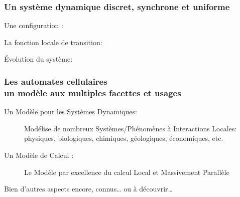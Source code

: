 \documentclass[8pt]{beamer}
\begin{document}
\begin{frame}
  \frametitle{Un système dynamique discret, synchrone et uniforme}
  
  \vspace{5mm}
  Une configuration : \\
  \begin{center}\end{center} 
  La fonction locale de transition:\\
  \begin{center}\end{center}
  Évolution du système:\\
  \begin{center}\end{center}
\end{frame}

\frame
{\frametitle{Les automates cellulaires\\
un modèle aux multiples facettes et usages}
\begin{description}
\item[Un Modèle pour les Systèmes Dynamiques:] Modélise de nombreux Systèmes/Phénomènes à Interactions Locales: physiques, biologiques, chimiques, géologiques, économiques, etc.\\
\item[Un Modèle de Calcul :]
Le Modèle par excellence du calcul Local et Massivement Parallèle
\end{description}

\medskip

Bien d'autres aspects encore, connus… ou à découvrir…
}
\end{document}
